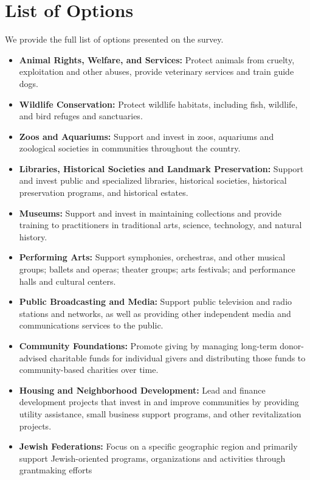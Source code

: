 \section{List of Options}
\label{sec:charityList}
We provide the full list of options presented on the survey.

\begin{itemize}[leftmargin=*]
    \item \textbf{Animal Rights, Welfare, and Services:} Protect animals from cruelty, exploitation and other abuses, provide veterinary services and train guide dogs.
    \item \textbf{Wildlife Conservation:} Protect wildlife habitats, including fish, wildlife, and bird refuges and sanctuaries.
    \item \textbf{Zoos and Aquariums:} Support and invest in zoos, aquariums and zoological societies in communities throughout the country.
    \item \textbf{Libraries, Historical Societies and Landmark Preservation:} Support and invest public and specialized libraries, historical societies, historical preservation programs, and historical estates.
    \item \textbf{Museums:} Support and invest in maintaining collections and provide training to practitioners in traditional arts, science, technology, and natural history.
    \item \textbf{Performing Arts:} Support symphonies, orchestras, and other musical groups; ballets and operas; theater groups; arts festivals; and performance halls and cultural centers.
    \item \textbf{Public Broadcasting and Media:} Support public television and radio stations and networks, as well as providing other independent media and communications services to the public.
    \item \textbf{Community Foundations:} Promote giving by managing long-term donor-advised charitable funds for individual givers and distributing those funds to community-based charities over time.
    \item \textbf{Housing and Neighborhood Development:} Lead and finance development projects that invest in and improve communities by providing utility assistance, small business support programs, and other revitalization projects.
    \item \textbf{Jewish Federations:} Focus on a specific geographic region and primarily support Jewish-oriented programs, organizations and activities through grantmaking efforts

\end{itemize}
